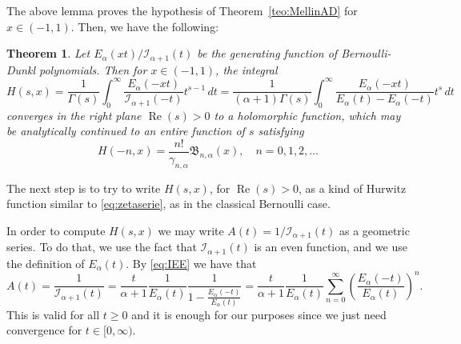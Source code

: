 \documentclass[a4paper]{amsart}
\newcommand{\I}{\mathcal{I}}
\newcommand{\Ea}{E_{\alpha}}
\newcommand{\B}{\mathfrak{B}}
\renewcommand{\Re}{\operatorname{Re}}
\theoremstyle{plain}
\newtheorem{theorem}{Theorem}[section]
\theoremstyle{definition}
\theoremstyle{remark}
\numberwithin{equation}{section}
\begin{document}
The above lemma proves the hypothesis of Theorem~\ref{teo:MellinAD} for $x\in(-1,1)$. Then, we have the following:

\begin{theorem}
\label{teo:mellinBD}
Let $\Ea(xt)/\I_{\alpha+1}(t)$ be the generating function of Bernoulli-Dunkl polynomials. 
Then for $x \in (-1,1)$, the integral
\begin{equation}
\label{eq:mellinBD}
H(s,x) = \frac{1}{\Gamma(s)} 
\int_{0}^{\infty} \frac{\Ea(-xt)}{\I_{\alpha+1}(-t)} t^{s-1}\,dt
= \frac{1}{(\alpha+1)\Gamma(s)}
\int_{0}^{\infty} \frac{\Ea(-xt)}{\Ea(t)-\Ea(-t)} t^{s}\,dt
\end{equation}
converges in the right plane $\Re(s) > 0$ to a holomorphic function, which may be analytically continued to an entire function of $s$ satisfying
\begin{equation*}
  H(-n,x) = \frac{n!}{\gamma_{n,\alpha}}\B_{n,\alpha}(x),\quad n=0,1,2,\dots
\end{equation*}
\end{theorem}

The next step is to try to write $H(s,x)$, for $\Re(s)>0$, as a kind of Hurwitz function similar to \eqref{eq:zetaserie}, as in the classical Bernoulli case.

In order to compute $H(s,x)$ we may write $A(t) = 1/\I_{\alpha+1}(t)$ as a geometric series. To do that, we use the fact that $\I_{\alpha+1}(t)$ is an even function, and we use the definition of $\Ea(t)$. By \eqref{eq:IEE} we have that 
\[
A(t) = \frac{1}{\I_{\alpha+1}(t)} 
= \frac{t}{\alpha+1} \frac{1}{\Ea(t)} \frac{1}{1 - \frac{\Ea(-t)}{\Ea(t)}}
= \frac{t}{\alpha+1} \frac{1}{\Ea(t)} \sum_{n=0}^{\infty} \left(\frac{\Ea(-t)}{\Ea(t)}\right)^n.
\]
This is valid for all $t \geq 0$ and it is enough for our purposes since we just need convergence for $t \in [0, \infty)$.
\end{document}
